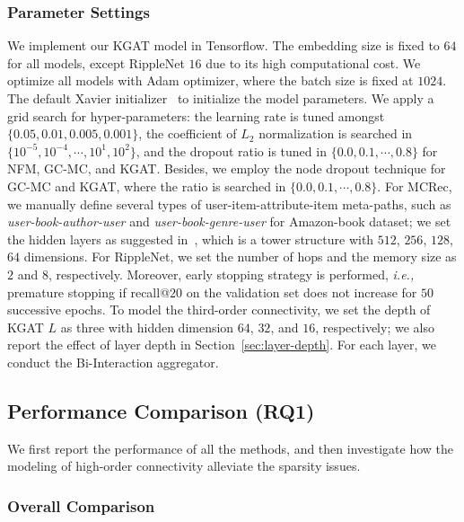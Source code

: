 \documentclass[sigconf]{acmart}
\newcommand{\ie}{\emph{i.e., }}
\theoremstyle{definition}
\begin{document}
\subsubsection{\textbf{Parameter Settings}}\label{sec:experiment-settings}
We implement our KGAT model in Tensorflow.
The embedding size is fixed to $64$ for all models, except RippleNet $16$ due to its high computational cost.
We optimize all models with Adam optimizer, where the batch size is fixed at $1024$.
The default Xavier initializer~\cite{Xarvier} to initialize the model parameters.
We apply a grid search for hyper-parameters: the learning rate is tuned amongst $\{0.05, 0.01, 0.005, 0.001\}$, the coefficient of $L_2$ normalization is searched in $\{10^{-5},10^{-4},\cdots,10^{1},10^{2}\}$, and the dropout ratio is tuned in $\{0.0,0.1,\cdots,0.8\}$ for NFM, GC-MC, and KGAT.
Besides, we employ the node dropout technique for GC-MC and KGAT, where the ratio is searched in $\{0.0,0.1,\cdots,0.8\}$.
For MCRec, we manually define several types of user-item-attribute-item meta-paths, such as \emph{user-book-author-user} and \emph{user-book-genre-user} for Amazon-book dataset; we set the hidden layers as suggested in~\cite{MCRec}, which is a tower structure with $512$, $256$, $128$, $64$ dimensions.
For RippleNet, we set the number of hops and the memory size as $2$ and $8$, respectively.
Moreover, early stopping strategy is performed, \ie premature stopping if recall@$20$ on the validation set does not increase for $50$ successive epochs.
To model the third-order connectivity, we set the depth of KGAT $L$ as three with hidden dimension $64$, $32$, and $16$, respectively; we also report the effect of layer depth in Section~\ref{sec:layer-depth}.
For each layer, we conduct the Bi-Interaction aggregator.



\subsection{Performance Comparison (RQ1)}
We first report the performance of all the methods, and then investigate how the modeling of high-order connectivity alleviate the sparsity issues.



\subsubsection{\textbf{Overall Comparison}}
\end{document}
